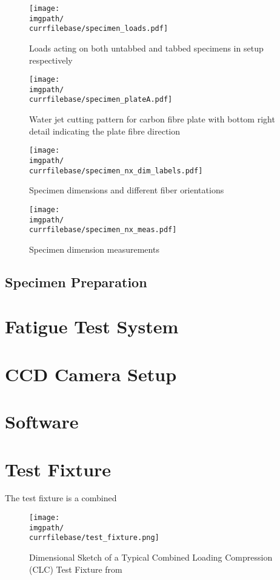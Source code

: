 \begin{figure}[!ht]
    \centering
    \texttt{[image: \\imgpath/\\currfilebase/specimen\_loads.pdf]}
    \caption{Loads acting on both untabbed and tabbed specimens in setup respectively}
    \label{fig:specimen_loads}
\end{figure}
\begin{figure}[!ht]
    \centering
    \texttt{[image: \\imgpath/\\currfilebase/specimen\_plateA.pdf]}
    \caption{Water jet cutting pattern for carbon fibre plate with bottom right detail indicating the plate fibre direction}
    \label{fig:specimen_plateA}
\end{figure}
\begin{figure}[!ht]
    \centering
    \texttt{[image: \\imgpath/\\currfilebase/specimen\_nx\_dim\_labels.pdf]}
    \caption{Specimen dimensions and different fiber orientations}
    \label{fig:specimen_nx_dim_labels}
\end{figure}
\begin{figure}[!ht]
    \centering
    \texttt{[image: \\imgpath/\\currfilebase/specimen\_nx\_meas.pdf]}
    \caption{Specimen dimension measurements}
    \label{fig:specimen_nx_meas}
\end{figure}

\subsection{Specimen Preparation}
\label{sec:spec_prep}

\section{Fatigue Test System}
\label{sec:fatigue_test_sys}

\section{CCD Camera Setup}
\label{sec:ccd_cam_setup}

\section{Software}
\label{sec:software}


\section{Test Fixture}
The test fixture is a combined
\begin{figure}[!ht]
    \centering
    \texttt{[image: \\imgpath/\\currfilebase/test\_fixture.png]}
    \caption{Dimensional Sketch of a Typical Combined Loading Compression (CLC) Test Fixture from \cite{D6641standard}}
    \label{fig:sketch_clc_fixture}
\end{figure}